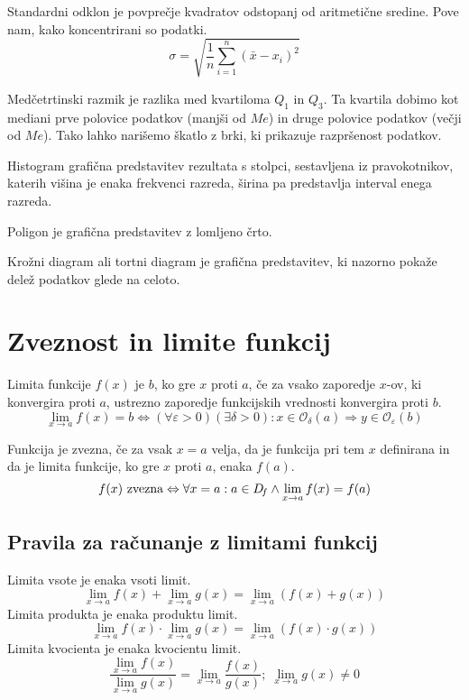 \documentclass[a4paper,oneside,12pt,fleqn]{article}
\newcommand\krat\cdot
\renewcommand\implies\Rightarrow
\renewcommand\iff\Leftrightarrow
\numberwithin{equation}{section}
\newenvironment{description*}%
{
\vspace{-12pt}%
\begin{description}%
\setlength{\itemsep}{0pt}%
\setlength{\parskip}{2pt}}%
{\end{description}}
\begin{document}
\begin{description*}
  \item[Standardni odklon] je povprečje kvadratov odstopanj od aritmetične sredine. Pove
    nam, kako koncentrirani so podatki. 
    \[ \sigma = \sqrt{\frac{1}{n}\sum_{i=1}^n\left(\bar{x}-x_i\right)^2} \]
  \item[Medčetrtinski razmik] je razlika med kvartiloma $Q_1$ in $Q_3$. Ta kvartila dobimo
    kot mediani prve polovice podatkov (manjši od $Me$) in druge polovice podatkov 
    (večji od $Me$). Tako lahko narišemo škatlo z brki, ki prikazuje razpršenost podatkov.
  \item[Histogram] grafična predstavitev rezultata s stolpci, sestavljena iz
    pravokotnikov, katerih višina je enaka frekvenci razreda, širina pa
    predstavlja interval enega razreda.
  \item[Poligon] je grafična predstavitev z lomljeno črto.
  \item[Krožni diagram] ali tortni diagram je grafična predstavitev, ki nazorno pokaže
    delež podatkov glede na celoto.
\end{description*}


\section{Zveznost in limite funkcij}
\label{sec:zvez}
Limita funkcije $f(x)$ je $b$, ko gre $x$ proti $a$, če za vsako zaporedje $x$-ov, ki
konvergira proti $a$, ustrezno zaporedje funkcijskih vrednosti konvergira proti $b$.
\[ \lim_{x\rightarrow a} f(x) = b \iff (\forall\varepsilon>0)(\exists\delta>0): x \in
\mathcal{O}_\delta(a) \implies y \in \mathcal{O}_\varepsilon(b) \]

Funkcija je zvezna, če za vsak $x = a$ velja, da je funkcija pri tem $x$ definirana in da je
limita funkcije, ko gre $x$ proti $a$, enaka $f(a)$.
\[ f(x) \textnormal{ zvezna} \iff \forall x = a: a \in D_{\!f} \land \lim_{x\rightarrow a} f(x) = f(a) \]

\subsection{Pravila za računanje z limitami funkcij}
\label{sec:zvez:prav}
Limita vsote je enaka vsoti limit.
\[ \lim_{x\rightarrow a}f(x) + \lim_{x\rightarrow a}g(x) = \lim_{x\rightarrow a}
\left(f(x)+g(x)\right) \]
Limita produkta je enaka produktu limit.
\[ \lim_{x\rightarrow a}f(x) \krat \lim_{x\rightarrow a}g(x) = \lim_{x\rightarrow a}
\left(f(x)\krat g(x)\right) \]
Limita kvocienta je enaka kvocientu limit.
\[ \frac{\displaystyle \lim_{x\rightarrow a}f(x)}{\displaystyle \lim_{x\rightarrow a}g(x)} = \lim_{x\rightarrow a}
\frac{f(x)}{g(x)}; \; \lim_{x\rightarrow a} g(x) \neq 0 \]
\end{document}
